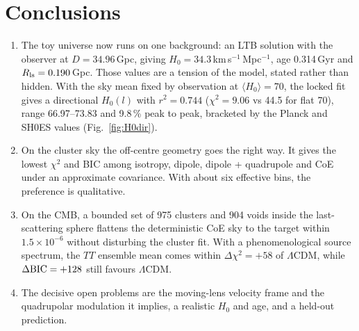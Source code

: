 \documentclass[11pt]{article}
\begin{document}
\section{Conclusions}\label{sec:concl}
\begin{enumerate}
\item The toy universe now runs on one background: an LTB solution with the observer at $D=34.96$\,Gpc, giving $H_0=34.3$\,km\,s$^{-1}$\,Mpc$^{-1}$, age 0.314\,Gyr and $R_{\rm ls}=0.190$\,Gpc. Those values are a tension of the model, stated rather than hidden. With the sky mean fixed by observation at $\langle H_0\rangle=70$, the locked fit gives a directional $H_0(l)$ with $r^2=0.744$ ($\chi^2=9.06$ vs 44.5 for flat 70), range 66.97--73.83 and 9.8\,\% peak to peak, bracketed by the Planck and SH0ES values (Fig.~\ref{fig:H0dir}).
\item On the cluster sky the off-centre geometry goes the right way. It gives the lowest $\chi^2$ and BIC among isotropy, dipole, dipole + quadrupole and CoE under an approximate covariance. With about six effective bins, the preference is qualitative.
\item On the CMB, a bounded set of 975 clusters and 904 voids inside the last-scattering sphere flattens the deterministic CoE sky to the target within $1.5\times10^{-6}$ without disturbing the cluster fit. With a phenomenological source spectrum, the $TT$ ensemble mean comes within $\Delta\chi^2=+58$ of $\Lambda$CDM, while $\Delta{\rm BIC}=+128$ still favours $\Lambda$CDM.
\item The decisive open problems are the moving-lens velocity frame and the quadrupolar modulation it implies, a realistic $H_0$ and age, and a held-out prediction.
\end{enumerate}
\end{document}

